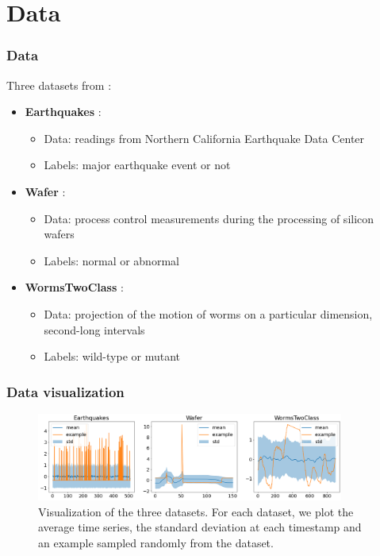 \documentclass{beamer}
\begin{document}
\section{Data}
\begin{frame}
\frametitle{Data}

Three datasets from \href{https://timeseriesclassification.com}{\color{blue}{https://timeseriesclassification.com}}:

\begin{itemize}
    \item \textbf{Earthquakes} \cite{bagnall_earthquakes_nodate}: 
    \begin{itemize}
        \item Data: readings from Northern California Earthquake Data Center
        \item Labels: major earthquake event or not
    \end{itemize}
    \item \textbf{Wafer} \cite{olszewski_wafer_nodate}:
    \begin{itemize}
        \item Data: process control measurements during the processing of silicon wafers
        \item Labels: normal or abnormal
    \end{itemize}
    \item \textbf{WormsTwoClass} \cite{brown_wormtwoclass_nodate}:
    \begin{itemize}
        \item Data: projection of the motion of worms on a particular dimension, second-long intervals
        \item Labels: wild-type or mutant
    \end{itemize}
\end{itemize}

\end{frame}

\begin{frame}
\frametitle{Data visualization}

\begin{figure}
    \centering
    \includegraphics[width=0.9\textwidth, keepaspectratio=True]{figures/ds_visualization.png}
    \caption{Visualization of the three datasets. For each dataset, we plot the average time series, the standard deviation at each timestamp and an example sampled randomly from the dataset.}
    \label{fig:ds_visulization}
\end{figure}

\end{frame}
\end{document}
